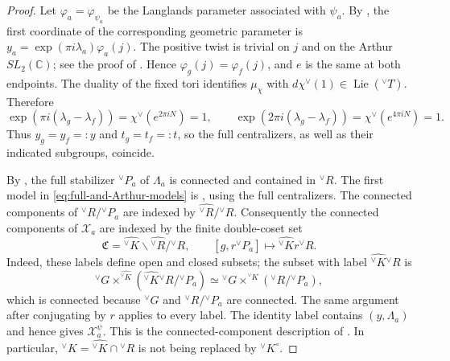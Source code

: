 \documentclass[10pt]{amsart}
\numberwithin{equation}{section}
\theoremstyle{plain}
\theoremstyle{definition}
\theoremstyle{remark}
\DeclareMathOperator{\Lie}{Lie}
\newcommand{\CC}{\mathbb C}
\newcommand{\vG}{{}^{\vee}G}
\newcommand{\vT}{{}^{\vee}T}
\newcommand{\vR}{{}^{\vee}R}
\newcommand{\vK}{{}^{\vee}K}
\newcommand{\vP}{{}^{\vee}P}
\begin{document}
\begin{proof}
Let $\varphi_a=\varphi_{\psi_a}$ be the Langlands parameter associated with
$\psi_a$. By \cite[Proposition~3.1.2]{AIMV26}, the first coordinate of the
corresponding geometric parameter is
$y_a=\exp(\pi i\lambda_a)\varphi_a(j)$.
The positive twist is trivial on $j$ and on the Arthur $SL_2(\CC)$;
see the proof of \cite[Theorem~4.6.1, before (4.6.1)]{AIMV26}.
Hence $\varphi_g(j)=\varphi_f(j)$, and $e$ is the same at both endpoints.
The duality of the fixed tori identifies $\mu_\chi$ with
$d\chi^\vee(1)\in\Lie(\vT)$. Therefore
\[
 \exp(\pi i(\lambda_g-\lambda_f))=\chi^\vee(e^{2\pi iN})=1,
 \qquad
 \exp(2\pi i(\lambda_g-\lambda_f))=\chi^\vee(e^{4\pi iN})=1.
\]
Thus $y_g=y_f=:y$ and $t_g=t_f=:t$, so the full centralizers, as well
as their indicated subgroups, coincide.

By \cite[Lemma~6.3(d) and Proposition~6.5(c)]{ABV92}, the full stabilizer
$\vP_a$ of $\Lambda_a$ is connected and contained in $\vR$.
The first model in \eqref{eq:full-and-Arthur-models} is
\cite[Proposition~6.16]{ABV92}, using the full centralizers.
The connected components of $\widehat{\vR}/\vP_a$ are indexed by
$\widehat{\vR}/\vR$. Consequently the connected components of
$\mathcal X_a$ are indexed by the finite double-coset set
\begin{equation}\label{eq:component-labels}
 \mathfrak C=\widehat{\vK}\backslash\widehat{\vR}/\vR,
 \qquad [g,r\vP_a]\longmapsto\widehat{\vK}r\vR.
\end{equation}
Indeed, these labels define open and closed subsets; the subset with
label $\widehat{\vK}\vR$ is
\[
 \vG\times^{\widehat{\vK}}
       (\widehat{\vK}\vR/\vP_a)
 \simeq\vG\times^{\vK}(\vR/\vP_a),
\]
which is connected because $\vG$ and $\vR/\vP_a$ are connected.
The same argument after conjugating by $r$ applies to every label.
The identity label contains $(y,\Lambda_a)$ and hence gives
$\mathcal X_a^\psi$. This is the connected-component description of
\cite[(6.23) and Proposition~6.24]{ABV92}.
In particular, $\vK=\widehat{\vK}\cap\vR$ is not being replaced by
$\vK^\circ$.


\end{proof}
\end{document}
